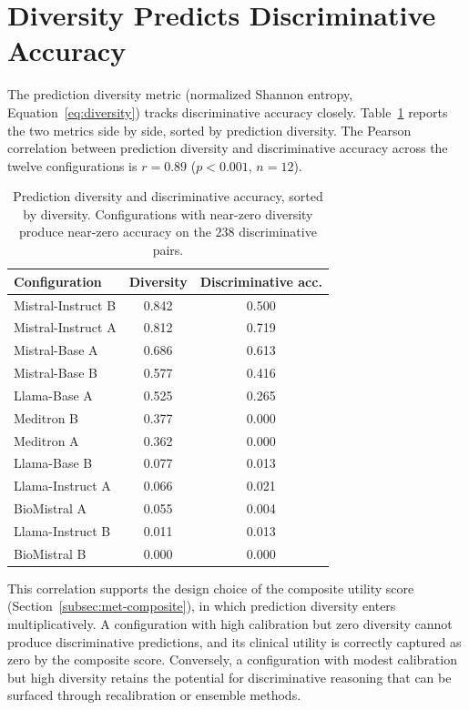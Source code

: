 \section{Diversity Predicts Discriminative Accuracy}
\label{sec:app-diversity-accuracy}

The prediction diversity metric (normalized Shannon entropy, 
Equation~\ref{eq:diversity}) tracks discriminative accuracy closely. 
Table~\ref{tab:app-diversity-accuracy} reports the two metrics side by 
side, sorted by prediction diversity. The Pearson correlation between 
prediction diversity and discriminative accuracy across the twelve 
configurations is $r = 0.89$ ($p < 0.001$, $n = 12$).

\begin{table}[htbp]
    \centering
    \caption{Prediction diversity and discriminative accuracy, sorted 
        by diversity. Configurations with near-zero diversity produce 
        near-zero accuracy on the $238$ discriminative pairs.}
    \label{tab:app-diversity-accuracy}
    \small
    \begin{tabular}{@{}lcc@{}}
        \toprule
        \textbf{Configuration} & 
        \textbf{Diversity} & 
        \textbf{Discriminative acc.} \\
        \midrule
        Mistral-Instruct B & 0.842 & 0.500 \\
        Mistral-Instruct A & 0.812 & 0.719 \\
        Mistral-Base A     & 0.686 & 0.613 \\
        Mistral-Base B     & 0.577 & 0.416 \\
        Llama-Base A       & 0.525 & 0.265 \\
        Meditron B         & 0.377 & 0.000 \\
        Meditron A         & 0.362 & 0.000 \\
        Llama-Base B       & 0.077 & 0.013 \\
        Llama-Instruct A   & 0.066 & 0.021 \\
        BioMistral A       & 0.055 & 0.004 \\
        Llama-Instruct B   & 0.011 & 0.013 \\
        BioMistral B       & 0.000 & 0.000 \\
        \bottomrule
    \end{tabular}
\end{table}

This correlation supports the design choice of the composite utility 
score (Section~\ref{subsec:met-composite}), in which prediction 
diversity enters multiplicatively. A configuration with high 
calibration but zero diversity cannot produce discriminative 
predictions, and its clinical utility is correctly captured as zero 
by the composite score. Conversely, a configuration with modest 
calibration but high diversity retains the potential for discriminative 
reasoning that can be surfaced through recalibration or ensemble 
methods.

